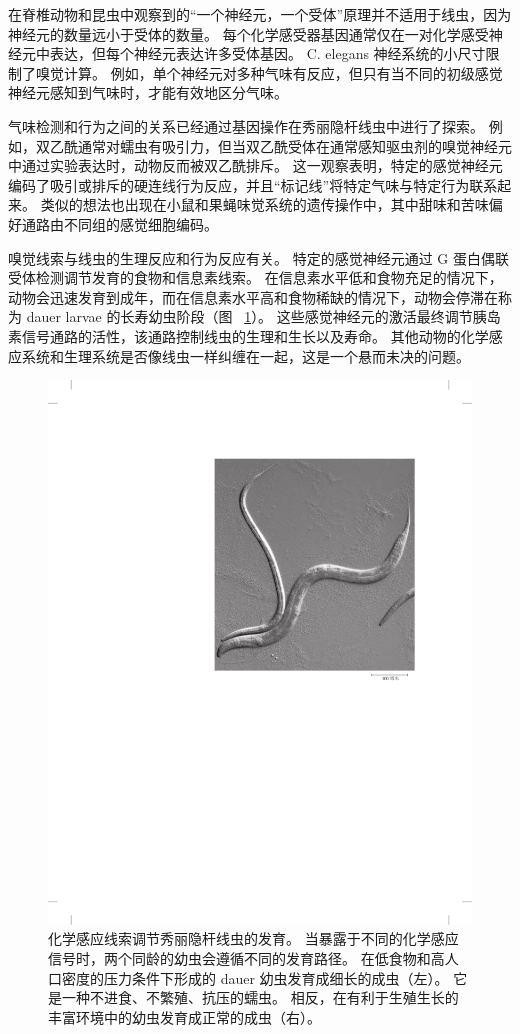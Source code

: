 在脊椎动物和昆虫中观察到的“一个神经元，一个受体”原理并不适用于线虫，因为神经元的数量远小于受体的数量。
每个化学感受器基因通常仅在一对化学感受神经元中表达，但每个神经元表达许多受体基因。
C. elegans 神经系统的小尺寸限制了嗅觉计算。
例如，单个神经元对多种气味有反应，但只有当不同的初级感觉神经元感知到气味时，才能有效地区分气味。


气味检测和行为之间的关系已经通过基因操作在秀丽隐杆线虫中进行了探索。
例如，双乙酰通常对蠕虫有吸引力，但当双乙酰受体在通常感知驱虫剂的嗅觉神经元中通过实验表达时，动物反而被双乙酰排斥。
这一观察表明，特定的感觉神经元编码了吸引或排斥的硬连线行为反应，并且“标记线”将特定气味与特定行为联系起来。
类似的想法也出现在小鼠和果蝇味觉系统的遗传操作中，其中甜味和苦味偏好通路由不同组的感觉细胞编码。


嗅觉线索与线虫的生理反应和行为反应有关。
特定的感觉神经元通过 G 蛋白偶联受体检测调节发育的食物和信息素线索。
在信息素水平低和食物充足的情况下，动物会迅速发育到成年，而在信息素水平高和食物稀缺的情况下，动物会停滞在称为 dauer larvae 的长寿幼虫阶段（图 ~\ref{fig:29_12}）。
这些感觉神经元的激活最终调节胰岛素信号通路的活性，该通路控制线虫的生理和生长以及寿命。
其他动物的化学感应系统和生理系统是否像线虫一样纠缠在一起，这是一个悬而未决的问题。


\begin{figure}[htbp]
	\centering
	\includegraphics[width=0.6\linewidth]{chap29/fig_29_12}
	\caption{化学感应线索调节秀丽隐杆线虫的发育。
		当暴露于不同的化学感应信号时，两个同龄的幼虫会遵循不同的发育路径。
		在低食物和高人口密度的压力条件下形成的 dauer 幼虫发育成细长的成虫（左）。
		它是一种不进食、不繁殖、抗压的蠕虫。
		相反，在有利于生殖生长的丰富环境中的幼虫发育成正常的成虫（右）。}
	\label{fig:29_12}
\end{figure}



